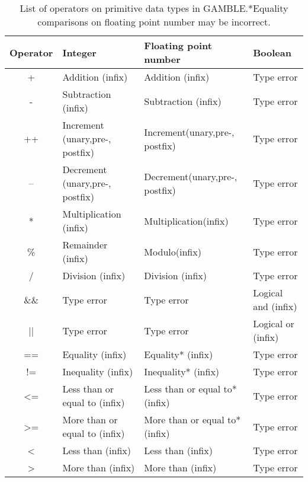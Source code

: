\begin{table}[h]
    \centering
    \begin{tabular}{|c|l|l|l|}
    \hline
    \textbf{Operator}  & \textbf{Integer}                   & \textbf{Floating point number}    & \textbf{Boolean}           \\ \hline
    +                  & Addition (infix)                   & Addition (infix)                  & Type error          \\ \hline 
    -                  & Subtraction (infix)                & Subtraction (infix)               & Type error          \\ \hline 
    ++                 & Increment (unary,pre-, postfix)    & Increment(unary,pre-, postfix)    & Type error   \\ \hline    
    --                 & Decrement (unary,pre-, postfix)    & Decrement(unary,pre-, postfix)    & Type error  \\ \hline
    *                  & Multiplication (infix)             & Multiplication(infix)             & Type error                  \\ \hline
    \%                 & Remainder (infix)                  & Modulo(infix)                     & Type error              \\ \hline
    /                  & Division (infix)                   & Division (infix)                  & Type error  \\ \hline
    \&\&               & Type error                         & Type error                        & Logical and (infix) \\ \hline 
    ||                 & Type error                         & Type error                        & Logical or (infix) \\ \hline 
    ==                 & Equality (infix)                   & Equality* (infix)                 & Type error \\ \hline 
    !=                 & Inequality (infix)                 & Inequality* (infix)               & Type error \\ \hline
    <=                 & Less than or equal to (infix)      & Less than or equal to* (infix)    & Type error \\ \hline
    >=                 & More than or equal to (infix)      & More than or equal to* (infix)    & Type error \\ \hline
    <                  & Less than (infix)                  & Less than (infix)                 & Type error \\ \hline
    >                  & More than (infix)                  & More than (infix)                 & Type error \\ \hline
    \end{tabular}
    \caption[List of operators on primitive data types in GAMBLE.]{List of operators on primitive data types in GAMBLE.\@*Equality comparisons on floating point number may be incorrect.}\label{tbl:operators}
\end{table}
\vspace{-20pt}